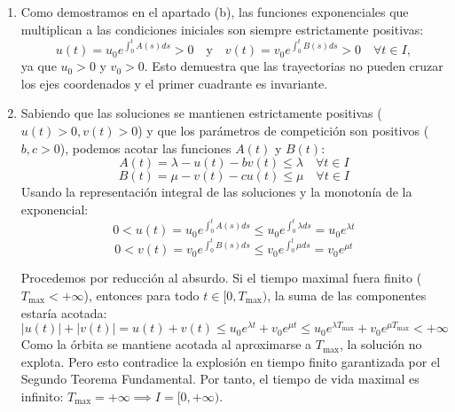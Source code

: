 {\begin{enumerate}[label=(\alph*)]
        \item Como demostramos en el apartado (b), las funciones exponenciales que multiplican a las condiciones iniciales son siempre estrictamente positivas:
        \[
            u(t) = u_0 e^{\int_0^t A(s) ds} > 0 \quad \text{y} \quad v(t) = v_0 e^{\int_0^t B(s) ds} > 0 \quad \forall t \in I,
        \]
        ya que $u_0 > 0$ y $v_0 > 0$. Esto demuestra que las trayectorias no pueden cruzar los ejes coordenados y el primer cuadrante es invariante.

        \item Sabiendo que las soluciones se mantienen estrictamente positivas ($u(t) > 0, v(t) > 0$) y que los parámetros de competición son positivos ($b, c > 0$), podemos acotar las funciones $A(t)$ y $B(t)$:
        \[
            A(t) = \lambda - u(t) - bv(t) \le \lambda \quad \forall t \in I
        \]
        \[
            B(t) = \mu - v(t) - cu(t) \le \mu \quad \forall t \in I
        \]
        Usando la representación integral de las soluciones y la monotonía de la exponencial:
        \[
            0 < u(t) = u_0 e^{\int_0^t A(s) ds} \le u_0 e^{\int_0^t \lambda ds} = u_0 e^{\lambda t}
        \]
        \[
            0 < v(t) = v_0 e^{\int_0^t B(s) ds} \le v_0 e^{\int_0^t \mu ds} = v_0 e^{\mu t}
        \]
        
        Procedemos por reducción al absurdo. Si el tiempo maximal fuera finito ($T_{\max} < +\infty$), entonces para todo $t \in [0, T_{\max})$, la suma de las componentes estaría acotada:
        \[
            |u(t)| + |v(t)| = u(t) + v(t) \le u_0 e^{\lambda t} + v_0 e^{\mu t} \le u_0 e^{\lambda T_{\max}} + v_0 e^{\mu T_{\max}} < +\infty
        \]
        Como la órbita se mantiene acotada al aproximarse a $T_{\max}$, la solución no explota. Pero esto contradice la explosión en tiempo finito garantizada por el Segundo Teorema Fundamental. Por tanto, el tiempo de vida maximal es infinito: $T_{\max} = +\infty \implies I = [0, +\infty)$.
    \end{enumerate}

}
